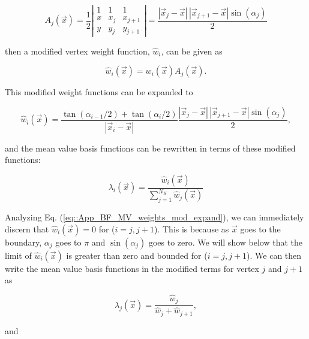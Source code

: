 \begin{equation}
\label{eq::App_BF_MV_weights_mod}
A_j (\vec{x}) = \frac{1}{2} 
\left|
\begin{array}{ccc}
1&1&1\\
x&x_j&x_{j+1}\\
y&y_j&y_{j+1}
\end{array}
\right|
= \frac{| \vec{x}_j - \vec{x} | \,| \vec{x}_{j+1} - \vec{x} | \sin (\alpha_j)}{2}
\end{equation}

\noindent then a modified vertex weight function, $\hat{w}_i$, can be given as

\begin{equation}
\label{eq::App_BF_MV_weights_mod}
\hat{w}_i (\vec{x})  = w_i (\vec{x}) A_j (\vec{x}) .
\end{equation}

\noindent This modified weight functions can be expanded to

\begin{equation}
\label{eq::App_BF_MV_weights_mod_expand}
\hat{w}_i (\vec{x})  = \frac{\tan(\alpha_{i-1} / 2) + \tan(\alpha_i / 2)}{|\vec{x}_i - \vec{x}|} \frac{| \vec{x}_j - \vec{x} | \,|\vec{x}_{j+1} - \vec{x} | \sin (\alpha_j)}{2},
\end{equation}

\noindent and the mean value basis functions can be rewritten in terms of these modified functions:

\begin{equation}
\label{eq::App_BF_MVBF_mod}
\lambda_i (\vec{x}) = \frac{\hat{w}_i  (\vec{x}) }{\sum\limits_{j=1}^{N_K} \hat{w}_j  (\vec{x}) }
\end{equation}

\noindent Analyzing Eq. (\ref{eq::App_BF_MV_weights_mod_expand}), we can immediately discern that $\hat{w}_i (\vec{x}) = 0 $ for ($i=j,j+1$). This is because as $\vec{x}$ goes to the boundary, $\alpha_j$ goes to $\pi$ and $\sin (\alpha_j)$ goes to zero. We will show below that the limit of $\hat{w}_i (\vec{x}) $ is greater than zero and bounded for ($i=j,j+1$). We can then write the mean value basis functions in the modified terms for vertex $j$ and $j+1$ as 

\begin{equation}
\label{eq::App_BF_MVBF_mod_j}
\lambda_j (\vec{x}) = \frac{\hat{w}_j  }{\hat{w}_j+ \hat{w}_{j+1} } ,
\end{equation}

\noindent and

